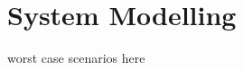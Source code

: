 \documentclass[../main.tex]{subfiles}
\begin{document}
\section{System Modelling} \label{modelling}
worst case scenarios here
\end{document}
